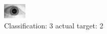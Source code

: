 \begin{figure}[h!]
\begin{center}
\includegraphics[width=0.60\columnwidth]{figures/ID1681_class_3_target_2.png}
\end{center}
\caption{ Classification: 3 actual target: 2}
\label{fig:ID1681_class_3_target_2}
\end{figure}
